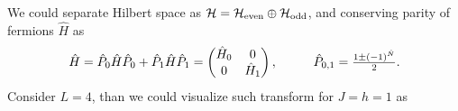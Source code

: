 We could separate Hilbert space as $\mathcal{H}=\mathcal{H}_{\textnormal{even}} \oplus \mathcal{H}_{\textnormal{odd}}$, and conserving parity of fermions $\hat{H}$ as
\begin{equation*}
	\hat{H} = \hat{P}_0 \hat{H} \hat{P}_0 + \hat{P}_1 \hat{H} \hat{P}_1 = \begin{pmatrix}
	    \hat{H}_0 & 0 \\
	    0 & \hat{H}_1 \\
	\end{pmatrix}
	,
	\hspace{10 mm} 
	\hat{P}_{0,1} = \tfrac{1 \pm (-1)^{\hat{N}}}{2}.
\end{equation*}
Consider $L=4$, than we could visualize such transform for $J=h=1$ as \vspace{-2mm}
